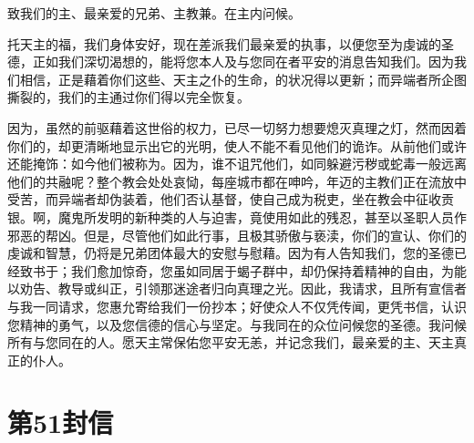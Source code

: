 致我们的主、最亲爱的兄弟、主教兼。在主内问候。\par

托天主的福，我们身体安好，现在差派我们最亲爱的执事，以便您至为虔诚的圣德，正如我们深切渴想的，能将您本人及与您同在者平安的消息告知我们。因为我们相信，正是藉着你们这些、天主之仆的生命，的状况得以更新；而异端者所企图撕裂的，我们的主通过你们得以完全恢复。\par

因为，虽然的前驱藉着这世俗的权力，已尽一切努力想要熄灭真理之灯，然而因着你们的，却更清晰地显示出它的光明，使人不能不看见他们的诡诈。从前他们或许还能掩饰：如今他们被称为。因为，谁不诅咒他们，如同躲避污秽或蛇毒一般远离他们的共融呢？整个教会处处哀恸，每座城市都在呻吟，年迈的主教们正在流放中受苦，而异端者却伪装着，他们否认基督，使自己成为税吏，坐在教会中征收贡银。啊，魔鬼所发明的新种类的人与迫害，竟使用如此的残忍，甚至以圣职人员作邪恶的帮凶。但是，尽管他们如此行事，且极其骄傲与亵渎，你们的宣认、你们的虔诚和智慧，仍将是兄弟团体最大的安慰与慰藉。因为有人告知我们，您的圣德已经致书于；我们愈加惊奇，您虽如同居于蝎子群中，却仍保持着精神的自由，为能以劝告、教导或纠正，引领那迷途者归向真理之光。因此，我请求，且所有宣信者与我一同请求，您惠允寄给我们一份抄本；好使众人不仅凭传闻，更凭书信，认识您精神的勇气，以及您信德的信心与坚定。与我同在的众位问候您的圣德。我问候所有与您同在的人。愿天主常保佑您平安无恙，并记念我们，最亲爱的主、天主真正的仆人。\par

\par



\section{第51封信}

